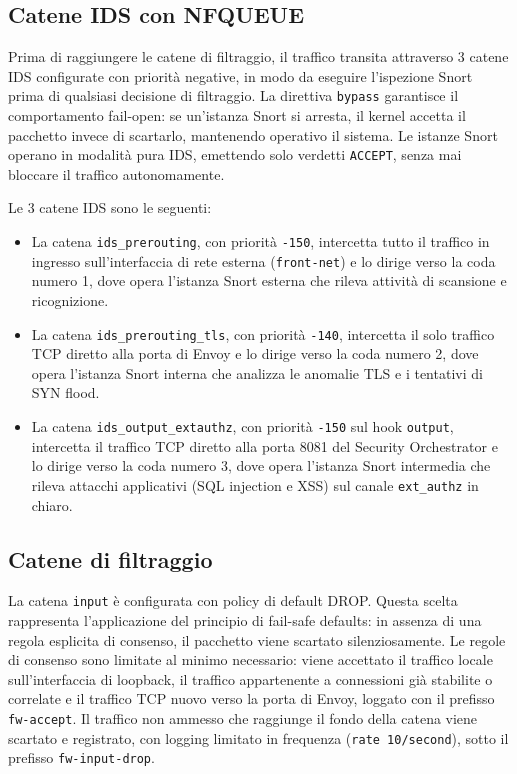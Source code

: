 \subsection*{Catene IDS con NFQUEUE}

Prima di raggiungere le catene di filtraggio, il traffico transita attraverso 3 catene IDS configurate con priorità negative, in modo da eseguire l'ispezione Snort prima di qualsiasi decisione di filtraggio. La direttiva \texttt{bypass} garantisce il comportamento fail-open: se un'istanza Snort si arresta, il kernel accetta il pacchetto invece di scartarlo, mantenendo operativo il sistema. Le istanze Snort operano in modalità pura IDS, emettendo solo verdetti \texttt{ACCEPT}, senza mai bloccare il traffico autonomamente.

Le 3 catene IDS sono le seguenti:

\begin{itemize}
    \item La catena \texttt{ids\_prerouting}, con priorità \texttt{-150}, intercetta tutto il traffico in ingresso sull'interfaccia di rete esterna (\texttt{front-net}) e lo dirige verso la coda numero 1, dove opera l'istanza Snort esterna che rileva attività di scansione e ricognizione.

    \item La catena \texttt{ids\_prerouting\_tls}, con priorità \texttt{-140}, intercetta il solo traffico TCP diretto alla porta di Envoy e lo dirige verso la coda numero 2, dove opera l'istanza Snort interna che analizza le anomalie TLS e i tentativi di SYN flood.

    \item La catena \texttt{ids\_output\_extauthz}, con priorità \texttt{-150} sul hook \texttt{output}, intercetta il traffico TCP diretto alla porta 8081 del Security Orchestrator e lo dirige verso la coda numero 3, dove opera l'istanza Snort intermedia che rileva attacchi applicativi (SQL injection e XSS) sul canale \texttt{ext\_authz} in chiaro.
\end{itemize}

\subsection*{Catene di filtraggio}

La catena \texttt{input} è configurata con policy di default DROP. Questa scelta rappresenta l'applicazione del principio di fail-safe defaults: in assenza di una regola esplicita di consenso, il pacchetto viene scartato silenziosamente. Le regole di consenso sono limitate al minimo necessario: viene accettato il traffico locale sull'interfaccia di loopback, il traffico appartenente a connessioni già stabilite o correlate e il traffico TCP nuovo verso la porta di Envoy, loggato con il prefisso \texttt{fw-accept}. Il traffico non ammesso che raggiunge il fondo della catena viene scartato e registrato, con logging limitato in frequenza (\texttt{rate 10/second}), sotto il prefisso \texttt{fw-input-drop}.

